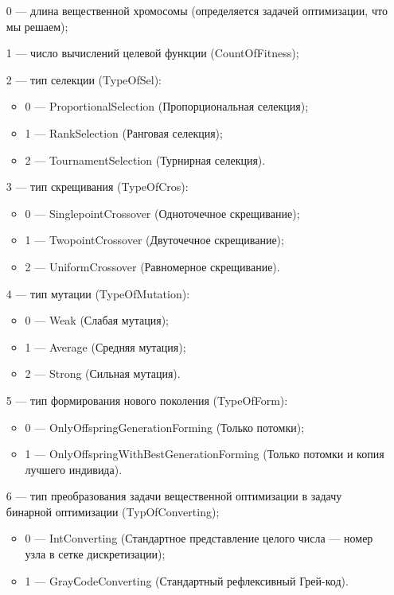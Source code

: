 \documentclass[a4paper,12pt]{article}
\begin{document}
 \begin{itemize}
 \item   [0] --- длина вещественной хромосомы (определяется задачей оптимизации, что мы решаем);
  \item   [1] --- число вычислений целевой функции (CountOfFitness);
  \item    [2] --- тип селекции (TypeOfSel):
 \begin{itemize}
       \item 0 --- ProportionalSelection (Пропорциональная селекция);
 
       \item 1 --- RankSelection (Ранговая селекция);
 
       \item 2 --- TournamentSelection (Турнирная селекция).
	    \end{itemize}
 
 \item [3] --- тип скрещивания (TypeOfCros):
  \begin{itemize}
       \item 0 --- SinglepointCrossover (Одноточечное скрещивание);
 
       \item 1 --- TwopointCrossover (Двуточечное скрещивание);
 
       \item 2 --- UniformCrossover (Равномерное скрещивание).
	    \end{itemize}
 
 \item [4] --- тип мутации (TypeOfMutation):
  \begin{itemize}
       \item 0 --- Weak (Слабая мутация);
 
       \item 1 --- Average (Средняя мутация);
 
       \item 2 --- Strong (Сильная мутация).
	    \end{itemize}
 
 \item [5] --- тип формирования нового поколения (TypeOfForm):
  \begin{itemize}
       \item 0 --- OnlyOffspringGenerationForming (Только потомки);
 
       \item 1 --- OnlyOffspringWithBestGenerationForming (Только потомки и копия лучшего индивида).
	    \end{itemize}
 \item [6] --- тип преобразования задачи вещественной оптимизации в задачу бинарной оптимизации (TypOfConverting);
   \begin{itemize}
        \item 0 --- IntConverting (Стандартное представление целого числа –-- номер узла в сетке дискретизации);
        \item 1 --- GrayСodeConverting (Стандартный рефлексивный Грей-код).
			    \end{itemize}
				

\end{itemize}
\end{document}
